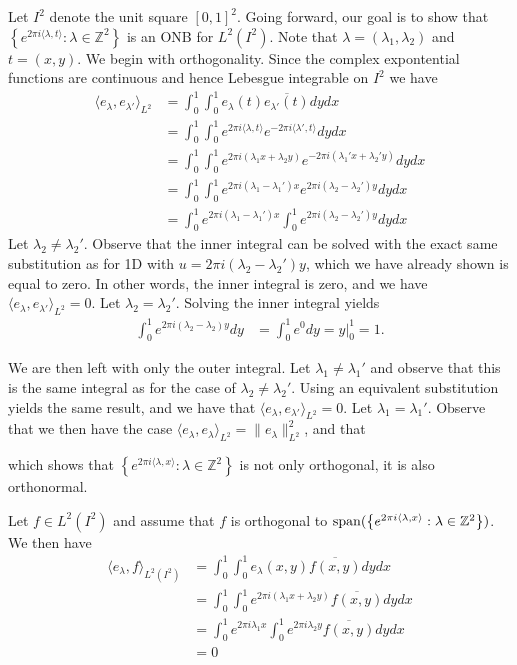 \documentclass[../thesis.tex]{subfiles}
\begin{document}
Let $I^2$ denote the unit square $[0,1]^2$. Going forward, our goal is to show that $\left\{ e^{2\pi i \langle \lambda,t  \rangle } : \lambda \in \mathbb{Z}^2\right\}$ is an ONB for $L^2{(I^2)}$. Note that $\lambda=(\lambda_1,\lambda_2)$ and $t=(x,y)$. We begin with orthogonality. Since the complex expontential functions are continuous and hence Lebesgue integrable on $I^2$ we have
\begin{align*} 
    \langle e_\lambda,e_{\lambda'} \rangle_{L^2} &= \int_0^1\int_0^1 e_{\lambda}(t) \overline{e_{\lambda'}(t)} dy dx\\ 
    &= \int_0^1\int_0^1 e^{2\pi i \langle \lambda,t\rangle } e^{-2\pi i  \langle \lambda',t\rangle} dy dx\\ 
    &= \int_0^1\int_0^1 e^{2\pi i  (\lambda_1x + \lambda_2 y)} e^{-2\pi i  (\lambda_1' x + \lambda_2' y)} dy dx\\ 
    &= \int_0^1\int_0^1 e^{2\pi i  (\lambda_1- \lambda_1')x} e^{2\pi i  (\lambda_2 - \lambda_2')y} dy dx\\ 
    &= \int_0^1e^{2\pi i  (\lambda_1- \lambda_1')x}\int_0^1  e^{2\pi i  (\lambda_2 - \lambda_2')y} dy dx
\end{align*}
Let $\lambda_2 \neq \lambda_2'$. Observe that the inner integral can be solved with the exact same substitution as for 1D with $u = 2 \pi i (\lambda_2 - \lambda_2')y$, which we have already shown is equal to zero. In other words, the inner integral is zero, and we have $\langle e_\lambda,e_{\lambda'} \rangle_{L^2} = 0$. Let $\lambda_2 = \lambda_2'$. Solving the inner integral yields
\begin{align*}
    \int_0^1  e^{2\pi i  (\lambda_2 - \lambda_2)y} dy&= \int_0^1 e^0 dy = y \big| _0^1 = 1.
\end{align*}

We are then left with only the outer integral. Let $\lambda_1 \neq \lambda_1'$ and observe that this is the same integral as for the case of $\lambda_2 \neq \lambda_2'$. Using an equivalent substitution yields the same result, and we have that $\langle e_\lambda,e_{\lambda'} \rangle_{L^2} = 0$. Let $\lambda_1 = \lambda_1'$. Observe that we then have the case $\langle e_\lambda,e_{\lambda} \rangle_{L^2} = \| e_\lambda \|^2_{L^2}$, and that 


which shows that $\left\{ e^{2\pi i \langle \lambda,x  \rangle } : \lambda \in \mathbb{Z}^2\right\}$ is not only orthogonal, it is also orthonormal.


Let $f\in L^2(I^2)$ and assume that $f$ is orthogonal to $\operatorname{span}(\left\{ e^{2\pi i \langle \lambda,x  \rangle} : \lambda \in \mathbb{Z}^2\right\})$. We then have
\begin{align*}
    \langle e_\lambda, f \rangle_{L^2(I^2)} &= \int_0^1 \int_0^1 e_\lambda(x,y) \overline{f(x,y)} dydx \\   
    &= \int_0^1 \int_0^1 e^{2\pi i  (\lambda_1x + \lambda_2 y)} \overline{f(x,y)} dydx \\
    &= \int_0^1 e^{2 \pi i \lambda_1 x}\int_0^1 e^{2 \pi i \lambda_2 y} \overline{f(x,y)} dydx \\
    &= 0
\end{align*}
\end{document}
